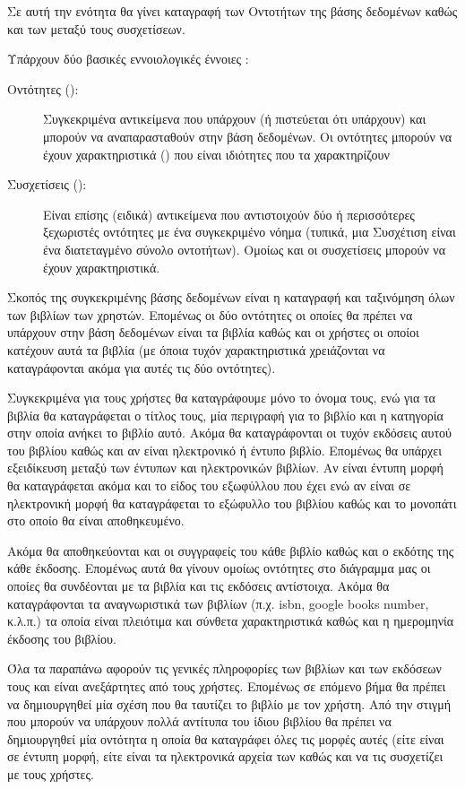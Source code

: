 \documentclass{assignment}
\begin{document}
Σε αυτή την ενότητα θα γίνει καταγραφή των Οντοτήτων της βάσης δεδομένων καθώς και των μεταξύ τους συσχετίσεων.

Υπάρχουν δύο βασικές εννοιολογικές έννοιες \cite{class_notes}:
\begin{description}
  \item[Οντότητες ():] Συγκεκριμένα αντικείμενα που υπάρχουν (ή πιστεύεται ότι υπάρχουν) και μπορούν να αναπαρασταθούν στην βάση δεδομένων. Οι οντότητες μπορούν να έχουν χαρακτηριστικά () που είναι ιδιότητες που τα χαρακτηρίζουν
  \item[Συσχετίσεις ():] Είναι επίσης (ειδικά) αντικείμενα που αντιστοιχούν δύο ή περισσότερες ξεχωριστές οντότητες με ένα συγκεκριμένο νόημα (τυπικά, μια Συσχέτιση είναι ένα διατεταγμένο σύνολο οντοτήτων). Ομοίως και οι συσχετίσεις μπορούν να έχουν χαρακτηριστικά.
\end{description}

Σκοπός της συγκεκριμένης βάσης δεδομένων είναι η καταγραφή και ταξινόμηση όλων των βιβλίων των χρηστών. Επομένως οι δύο οντότητες οι οποίες θα πρέπει να υπάρχουν στην βάση δεδομένων είναι τα βιβλία καθώς και οι χρήστες οι οποίοι κατέχουν αυτά τα βιβλία (με όποια τυχόν χαρακτηριστικά χρειάζονται να καταγράφονται ακόμα για αυτές τις δύο οντότητες).

Συγκεκριμένα για τους χρήστες θα καταγράφουμε μόνο το όνομα τους, ενώ για τα βιβλία θα καταγράφεται ο τίτλος τους, μία περιγραφή για το βιβλίο και η κατηγορία στην οποία ανήκει το βιβλίο αυτό. Ακόμα θα καταγράφονται οι τυχόν εκδόσεις αυτού του βιβλίου καθώς και αν είναι ηλεκτρονικό ή έντυπο βιβλίο. Επομένως θα υπάρχει εξειδίκευση μεταξύ των έντυπων και ηλεκτρονικών βιβλίων. Αν είναι έντυπη μορφή θα καταγράφεται ακόμα και το είδος του εξωφύλλου που έχει ενώ αν είναι σε ηλεκτρονική μορφή θα καταγράφεται το εξώφυλλο του βιβλίου καθώς και το μονοπάτι στο οποίο θα είναι αποθηκευμένο.

Ακόμα θα αποθηκεύονται και οι συγγραφείς του κάθε βιβλίο καθώς και ο εκδότης της κάθε έκδοσης. Επομένως αυτά θα γίνουν ομοίως οντότητες στο διάγραμμα μας οι οποίες θα συνδέονται με τα βιβλία και τις εκδόσεις αντίστοιχα. Ακόμα θα καταγράφονται τα αναγνωριστικά των βιβλίων (π.χ. isbn, google books number, κ.λ.π.) τα οποία είναι πλειότιμα και σύνθετα χαρακτηριστικά καθώς και η ημερομηνία έκδοσης του βιβλίου.

Όλα τα παραπάνω αφορούν τις γενικές πληροφορίες των βιβλίων και των εκδόσεων τους και είναι ανεξάρτητες από τους χρήστες. Επομένως σε επόμενο βήμα θα πρέπει να δημιουργηθεί μία σχέση που θα ταυτίζει το βιβλίο με τον χρήστη. Από την στιγμή που μπορούν να υπάρχουν πολλά αντίτυπα του ίδιου βιβλίου θα πρέπει να δημιουργηθεί μία οντότητα η οποία θα καταγράφει όλες τις μορφές αυτές (είτε είναι σε έντυπη μορφή, είτε είναι τα ηλεκτρονικά αρχεία των  καθώς και να τις συσχετίζει με τους χρήστες.
\end{document}
